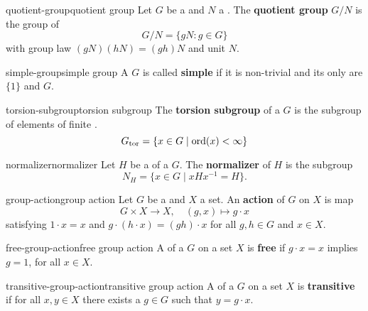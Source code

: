 \begin{topic}{quotient-group}{quotient group}
    Let $G$ be a  and $N$ a . The \textbf{quotient group} $G/N$ is the group of 
    \[ G/N = \{ gN : g \in G \} \]
    with group law $(gN)(hN) = (gh)N$ and unit $N$.
\end{topic}

\begin{topic}{simple-group}{simple group}
    A  $G$ is called \textbf{simple} if it is non-trivial and its only  are $\{ 1 \}$ and $G$.
\end{topic}

\begin{topic}{torsion-subgroup}{torsion subgroup}
    The \textbf{torsion subgroup} of a  $G$ is the subgroup of elements of finite .
    \[ G_{\textup{tor}} = \{ x \in G \mid \textup{ord}(x) < \infty \} \]
\end{topic}

\begin{topic}{normalizer}{normalizer}
    Let $H$ be a  of a  $G$. The \textbf{normalizer} of $H$ is the subgroup
    \[ N_H = \{ x \in G \mid x H x^{-1} = H \} . \]
\end{topic}

\begin{topic}{group-action}{group action}
    Let $G$ be a  and $X$ a set. An \textbf{action} of $G$ on $X$ is map
    \[ G \times X \to X, \quad (g, x) \mapsto g \cdot x \]
    satisfying $1 \cdot x = x$ and $g \cdot (h \cdot x) = (gh) \cdot x$ for all $g, h \in G$ and $x \in X$.
\end{topic}

\begin{topic}{free-group-action}{free group action}
    A  of a  $G$ on a set $X$ is \textbf{free} if $g \cdot x = x$ implies $g = 1$, for all $x \in X$.
\end{topic}

\begin{topic}{transitive-group-action}{transitive group action}
    A  of a  $G$ on a set $X$ is \textbf{transitive} if for all $x, y \in X$ there exists a $g \in G$ such that $y = g \cdot x$.
\end{topic}

